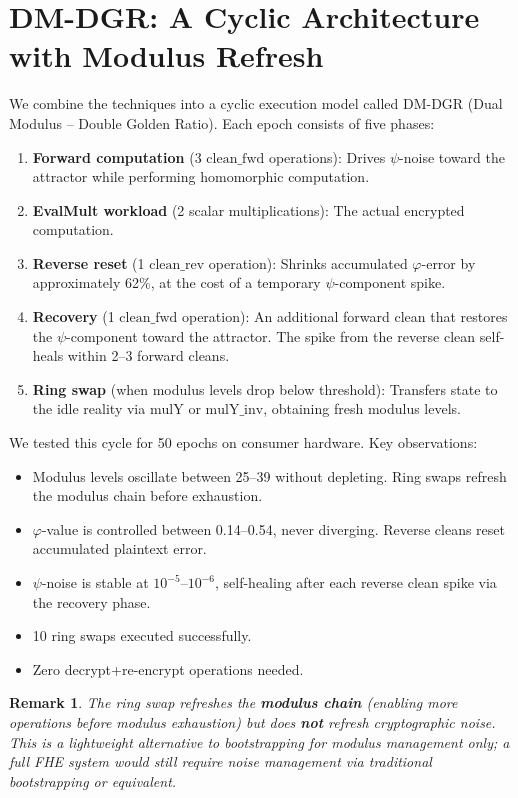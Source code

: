 \documentclass[11pt,a4paper]{article}
\newtheorem{remark}[theorem]{Remark}
\begin{document}
\section{DM-DGR: A Cyclic Architecture with Modulus Refresh}

We combine the techniques into a cyclic execution model called DM-DGR (Dual Modulus -- Double Golden Ratio). Each epoch consists of five phases:

\begin{enumerate}
    \item \textbf{Forward computation} (3 $\text{clean\_fwd}$ operations): Drives $\psi$-noise toward the attractor while performing homomorphic computation.
    \item \textbf{EvalMult workload} (2 scalar multiplications): The actual encrypted computation.
    \item \textbf{Reverse reset} (1 $\text{clean\_rev}$ operation): Shrinks accumulated $\varphi$-error by approximately 62\%, at the cost of a temporary $\psi$-component spike.
    \item \textbf{Recovery} (1 $\text{clean\_fwd}$ operation): An additional forward clean that restores the $\psi$-component toward the attractor. The spike from the reverse clean self-heals within 2--3 forward cleans.
    \item \textbf{Ring swap} (when modulus levels drop below threshold): Transfers state to the idle reality via $\text{mulY}$ or $\text{mulY\_inv}$, obtaining fresh modulus levels.
\end{enumerate}

We tested this cycle for 50 epochs on consumer hardware. Key observations:

\begin{itemize}
    \item Modulus levels oscillate between 25--39 without depleting. Ring swaps refresh the modulus chain before exhaustion.
    \item $\varphi$-value is controlled between 0.14--0.54, never diverging. Reverse cleans reset accumulated plaintext error.
    \item $\psi$-noise is stable at $10^{-5}$--$10^{-6}$, self-healing after each reverse clean spike via the recovery phase.
    \item 10 ring swaps executed successfully.
    \item Zero decrypt+re-encrypt operations needed.
\end{itemize}

\begin{remark}
The ring swap refreshes the \textbf{modulus chain} (enabling more operations before modulus exhaustion) but does \textbf{not} refresh cryptographic noise. This is a lightweight alternative to bootstrapping for modulus management only; a full FHE system would still require noise management via traditional bootstrapping or equivalent.
\end{remark}
\end{document}
